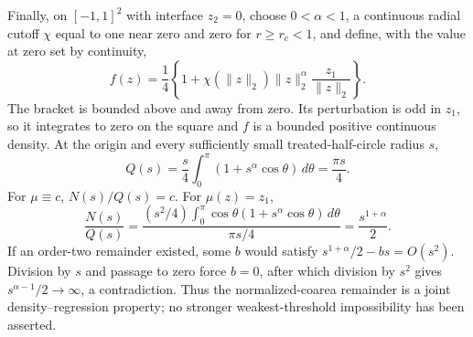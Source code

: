 Finally, on \([-1,1]^2\) with interface \(z_2=0\), choose \(0<\alpha<1\), a continuous radial cutoff \(\chi\) equal to one near zero and zero for \(r\geq r_c<1\), and define, with the value at zero set by continuity,
\[
 f(z)=\frac14\left\{1+\chi(\lVert z\rVert_2)
 \lVert z\rVert_2^\alpha\frac{z_1}{\lVert z\rVert_2}\right\}.
\]
The bracket is bounded above and away from zero.  Its perturbation is odd in \(z_1\), so it integrates to zero on the square and \(f\) is a bounded positive continuous density.  At the origin and every sufficiently small treated-half-circle radius \(s\),
\[
 Q(s)=\frac{s}{4}\int_0^\pi(1+s^\alpha\cos\theta)\,d\theta
 =\frac{\pi s}{4}.
\]
For \(\mu\equiv c\), \(N(s)/Q(s)=c\).  For \(\mu(z)=z_1\),
\[
 \frac{N(s)}{Q(s)}
 =\frac{(s^2/4)\int_0^\pi\cos\theta(1+s^\alpha\cos\theta)\,d\theta}
 {\pi s/4}
 =\frac{s^{1+\alpha}}2.
\]
If an order-two remainder existed, some \(b\) would satisfy \(s^{1+\alpha}/2-bs=O(s^2)\).  Division by \(s\) and passage to zero force \(b=0\), after which division by \(s^2\) gives \(s^{\alpha-1}/2\to\infty\), a contradiction.  Thus the normalized-coarea remainder is a joint density--regression property; no stronger weakest-threshold impossibility has been asserted.